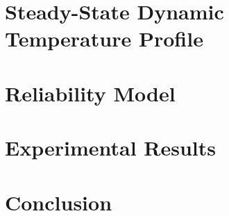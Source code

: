 \documentclass[conference]{IEEEtran}
\begin{document}
  \section{Steady-State Dynamic Temperature Profile}
  

  \section{Reliability Model}
  

  \section{Experimental Results} \label{sec:results}
  

  \section{Conclusion}
  

  
\end{document}
